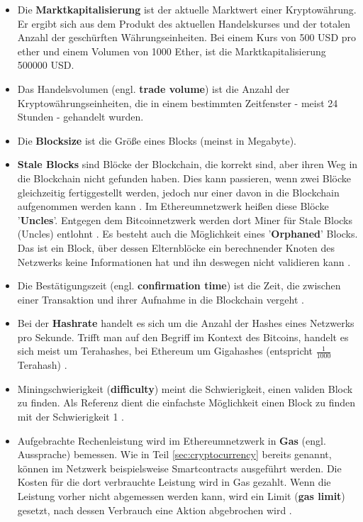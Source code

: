 \begin{itemize}
\item Die \textbf{Marktkapitalisierung} ist der aktuelle Marktwert einer Kryptowährung. Er ergibt sich aus dem Produkt des aktuellen Handelskurses und der totalen Anzahl der geschürften Währungseinheiten. Bei einem Kurs von 500 USD pro \gls{ether} und einem Volumen von 1000 Ether, ist die Marktkapitalisierung 500000 USD.
\item Das Handelsvolumen (engl. \textbf{trade volume}) ist die Anzahl der Kryptowährungseinheiten, die in einem bestimmten Zeitfenster - meist 24 Stunden - gehandelt wurden.
\item Die \textbf{Blocksize} ist die Größe eines Blocks (meinst in Megabyte).
\item \textbf{Stale Blocks} sind Blöcke der Blockchain, die korrekt sind, aber ihren Weg in die Blockchain nicht gefunden haben. Dies kann passieren, wenn zwei Blöcke gleichzeitig fertiggestellt werden, jedoch nur einer davon in die Blockchain aufgenommen werden kann \citep{bitcoinproject_stale_2017}. Im Ethereumnetzwerk heißen diese Blöcke '\textbf{Uncles}'. Entgegen dem Bitcoinnetzwerk werden dort Miner für Stale Blocks (Uncles) entlohnt \citep{jdebunt_what_2017}. Es besteht auch die Möglichkeit eines '\textbf{Orphaned}' Blocks. Das ist ein Block, über dessen Elternblöcke ein berechnender Knoten des Netzwerks keine Informationen hat und ihn deswegen nicht validieren kann \citep{bitcoinproject_orphan_2017}.
\item Die Bestätigungszeit (engl. \textbf{confirmation time}) ist die Zeit, die zwischen einer Transaktion und ihrer Aufnahme in die Blockchain vergeht \citep{kumar_cryptocurrency_2017}.
\item Bei der \textbf{Hashrate} handelt es sich um die Anzahl der Hashes eines Netzwerks pro Sekunde. Trifft man auf den Begriff im Kontext des Bitcoins, handelt es sich meist um Terahashes, bei Ethereum um Gigahashes (entspricht $ \frac{1}{1000}$ Terahash) \citep{kumar_cryptocurrency_2017}.
\item Miningschwierigkeit (\textbf{difficulty}) meint die Schwierigkeit, einen validen Block zu finden. Als Referenz dient die einfachste Möglichkeit einen Block zu finden mit der Schwierigkeit 1 \citep{bitcoinproject_difficulty_2017}.
\item Aufgebrachte Rechenleistung wird im Ethereumnetzwerk in \textbf{Gas} (engl. Aussprache) bemessen. Wie in Teil \ref{sec:cryptocurrency} bereits genannt, können im Netzwerk beispielsweise Smartcontracts ausgeführt werden. Die Kosten für die dort verbrauchte Leistung wird in Gas gezahlt. Wenn die Leistung vorher nicht abgemessen werden kann, wird ein Limit (\textbf{gas limit}) gesetzt, nach dessen Verbrauch eine Aktion abgebrochen wird \citep[S.~4]{wood_ethereum:_2014}.
\end{itemize}

